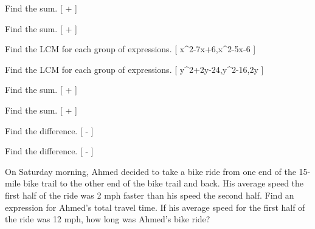 \documentclass{article}
\newenvironment{practice}[2]{}{}
\newcommand{\answer}[1]{}
\newcommand{\placeholder}[2]{}
\begin{document}
\begin{practice}{18}{1}
Find the sum.
[
+
]
\answer{(\frac{4x+9}{x+7})}
\end{practice}

\begin{practice}{19}{1}
Find the sum.
[
+
]
\answer{(\frac{12y+5}{y^2+4})}
\end{practice}

\begin{practice}{20}{1}
Find the LCM for each group of expressions.
[
x^2-7x+6,\quad x^2-5x-6
]
\answer{((x-6)(x+1)(x-1))}
\end{practice}

\begin{practice}{21}{1}
Find the LCM for each group of expressions.
[
y^2+2y-24,\quad y^2-16,\quad 2y
]
\answer{(2y(y+6)(y+4)(y-4))}
\end{practice}

\begin{practice}{22}{1}
Find the sum.
[
+
]
\answer{(\frac{8}{x-8})}
\end{practice}

\begin{practice}{23}{1}
Find the sum.
[
+
]
\answer{(\frac{5y-1}{y(2y-1)})}
\end{practice}

\begin{practice}{24}{1}
Find the difference.
[
-
]
\answer{(-\frac{4}{(x+1)(x-1)})}
\end{practice}

\begin{practice}{25}{1}
Find the difference.
[
-
]
\answer{(\frac{2y-14}{15(y+5)}) or (\frac{2(y-7)}{15(y+5)})}
\end{practice}

\begin{practice}{26}{2}
On Saturday morning, Ahmed decided to take a bike ride from one end of the 15-mile bike trail to the other end of the bike trail and back. His average speed the first half of the ride was 2 mph faster than his speed the second half. Find an expression for Ahmed's total travel time. If his average speed for the first half of the ride was 12 mph, how long was Ahmed's bike ride?

\placeholder{illustration}{Bike trail with cyclist, sign "Trail length 15 miles", one label "Speed x+2" and another label "Speed x".}

\answer{(\frac{30(x+1)}{x(x+2)}); 2.75 hours}
\end{practice}
\end{document}
